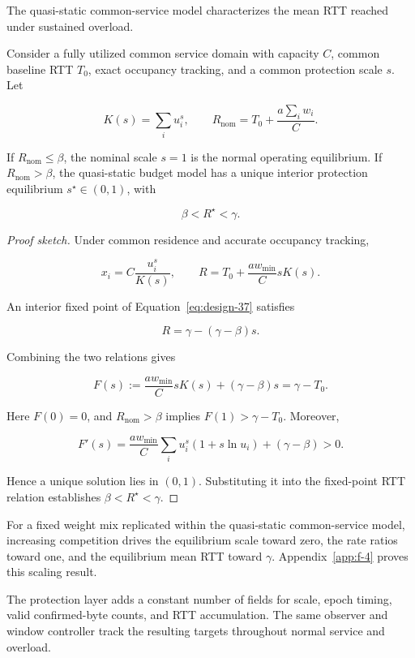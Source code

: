 The quasi-static common-service model characterizes the mean RTT reached under sustained overload.

\begin{proposition}
\label{prop:main-3}
Consider a fully utilized common service domain with capacity \(C\), common baseline RTT \(T_0\), exact occupancy tracking, and a common protection scale \(s\). Let

\[
K(s)=\sum_i u_i^s,
\qquad
R_{\mathrm{nom}}
=
T_0+\frac{a\sum_iw_i}{C}.
\]

If \(R_{\mathrm{nom}}\le\beta\), the nominal scale \(s=1\) is the normal operating equilibrium. If \(R_{\mathrm{nom}}>\beta\), the quasi-static budget model has a unique interior protection equilibrium \(s^\star\in(0,1)\), with

\begin{equation}
\label{eq:design-40}
\boxed{
\beta<R^\star<\gamma.
}
\end{equation}
\end{proposition}

\begin{proof}[Proof sketch] Under common residence and accurate occupancy tracking,

\begin{equation}
\label{eq:design-41}
x_i=C\frac{u_i^s}{K(s)},
\qquad
R=T_0+\frac{aw_{\min}}{C}sK(s).
\end{equation}

An interior fixed point of Equation~\eqref{eq:design-37} satisfies

\[
R=\gamma-(\gamma-\beta)s.
\]

Combining the two relations gives

\begin{equation}
\label{eq:design-42}
F(s):=
\frac{aw_{\min}}{C}sK(s)
+(\gamma-\beta)s
=\gamma-T_0.
\end{equation}

Here \(F(0)=0\), and \(R_{\mathrm{nom}}>\beta\) implies \(F(1)>\gamma-T_0\). Moreover,

\[
F'(s)
=
\frac{aw_{\min}}{C}
\sum_i u_i^s(1+s\ln u_i)
+(\gamma-\beta)>0.
\]

Hence a unique solution lies in \((0,1)\). Substituting it into the fixed-point RTT relation establishes \(\beta<R^\star<\gamma\).
\end{proof}

For a fixed weight mix replicated within the quasi-static common-service model, increasing competition drives the equilibrium scale toward zero, the rate ratios toward one, and the equilibrium mean RTT toward \(\gamma\). Appendix~\ref{app:f-4} proves this scaling result.

The protection layer adds a constant number of fields for scale, epoch timing, valid confirmed-byte counts, and RTT accumulation. The same observer and window controller track the resulting targets throughout normal service and overload.
